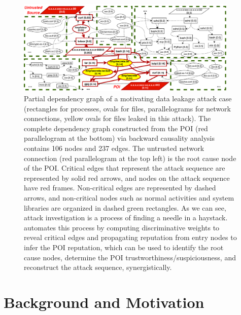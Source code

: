 
\begin{figure}[!t]
    \centering
    \includegraphics[width=0.94\textwidth]{figs/overview.pdf}
    \caption{Partial dependency graph of a motivating data leakage attack case (rectangles for processes, ovals for files, parallelograms for network connections, yellow ovals for files leaked in this attack).
    The complete dependency graph constructed from the POI (red parallelogram at the bottom) via backward causality analysis contains 106 nodes and 237 edges.
    The untrusted network connection (red parallelogram at the top left) is the root cause node of the POI. %
    Critical edges 
    that represent the attack sequence are represented by solid red arrows, and nodes on the attack sequence have red frames. 
    Non-critical edges are represented by dashed arrows, and non-critical nodes such as normal activities and system libraries are organized in dashed green rectangles.
    As we can see, attack investigation is a process of finding a needle in a haystack. 
    \tool automates this process by computing discriminative weights to reveal critical edges and propagating reputation from entry nodes to infer the POI reputation, which can be used to identify the root cause nodes, determine the POI trustworthiness/suspiciousness, and reconstruct the attack sequence, synergistically.
    }
    \label{fig:motivate}
\end{figure}



\section{Background and Motivation}

